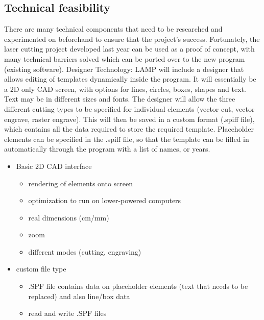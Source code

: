 \documentclass[oneside,openany,11pt,a4paper]{report}
\begin{document}
\subsection{Technical feasibility}
There are many technical components that need to be researched and experimented on beforehand to ensure that the project's success. Fortunately, the laser cutting project developed last year can be used as a proof of concept, with many technical barriers solved which can be ported over to the new program (existing software).
Designer Technology:
LAMP will include a designer that allows editing of templates dynamically inside the program. It will essentially be a 2D only CAD screen, with options for lines, circles, boxes, shapes and text. Text may be in different sizes and fonts. The designer will allow the three different cutting types to be specified for individual elements (vector cut, vector engrave, raster engrave). This will then be saved in a custom format (.spiff file), which contains all the data required to store the required template. Placeholder elements can be specified in the .spiff file, so that the template can be filled in automatically through the program with a list of names, or years.
\begin{itemize}
	\item Basic 2D CAD interface
	\begin{itemize}
		\itemsep0em
		\item rendering of elements onto screen
		\item optimization to run on lower-powered computers
		\item real dimensions (cm/mm)
		\item zoom
		\item different modes (cutting, engraving)
	\end{itemize}
	
	\item custom file type
	\begin{itemize}
		\itemsep0em
		\item .SPF file contains data on placeholder elements (text that needs to be replaced) and also line/box data
		\item read and write .SPF files
	\end{itemize}
\end{itemize}
\end{document}
